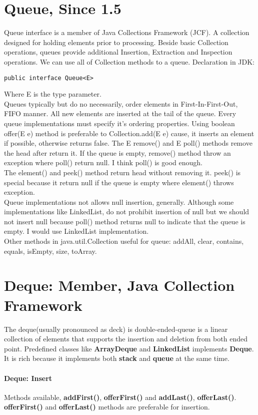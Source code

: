 \documentclass[10 pt]{article}
\begin{document}
\section{Queue, Since 1.5}
Queue interface is a member of Java Collections Framework (JCF). A collection designed for holding elements prior to processing. Beside basic Collection operations, queues provide additional Insertion, Extraction and Inspection operations. We can use all of Collection methods to a queue. Declaration in JDK:
\begin{lstlisting}
public interface Queue<E>
\end{lstlisting}
Where E is the type parameter. \\
Queues typically but do no necessarily, order elements in First-In-First-Out, FIFO manner. All new elements are inserted at the tail of the queue. Every queue implementations must specify it's ordering properties. Using boolean offer(E e) method is preferable to Collection.add(E e) cause, it inserts an element if possible, otherwise returns false. The E remove() and E poll() methods remove the head after return it. If the queue is empty, remove() method throw an exception where poll() return null. I think poll() is good enough. \\
The element() and peek() method return head without removing it. peek() is special because it return null if the queue is empty where element() throws exception. \\
Queue implementations not allows null insertion, generally. Although some implementations like LinkedList, do not prohibit insertion of null but we should not insert null because poll() method returns null to indicate that the queue is empty. I would use LinkedList implementation. \\
Other methods in java.util.Collection useful for queue: addAll, clear, contains, equals, isEmpty, size, toArray.

\section{Deque: Member, Java Collection Framework}
The deque(usually pronounced as deck) is double-ended-queue is a linear collection of elements that supports the insertion and deletion from both ended point. Predefined classes like \textbf{ArrayDeque} and \textbf{LinkedList} implements \textbf{Deque}. It is rich because it implements both \textbf{stack} and \textbf{queue} at the same time.
\paragraph{Deque: Insert}
Methods available, \textbf{addFirst()}, \textbf{offerFirst()} and \textbf{addLast()}, \textbf{offerLast()}. \\
\textbf{offerFirst()} and \textbf{offerLast()} methods are preferable for insertion.
\end{document}
